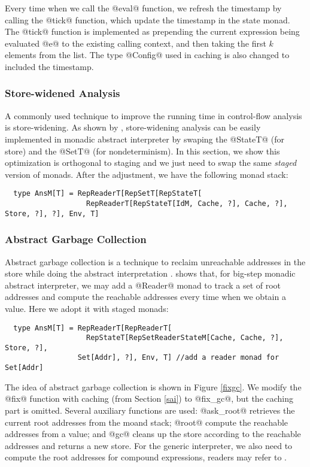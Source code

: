 Every time when we call the @eval@ function, we refresh the timestamp by calling
the @tick@ function, which update the timestamp in the state monad. The @tick@
function is implemented as prepending the current expression being evaluated @e@
to the existing calling context, and then taking the first $k$ elements from the list.
The type @Config@ used in caching is also changed to included the timestamp.

\subsubsection{Store-widened Analysis}

A commonly used technique to improve the running time in control-flow analysis
is store-widening. As shown by \cite{Darais:2015:GTM:2814270.2814308,
DBLP:journals/pacmpl/DaraisLNH17}, store-widening analysis can be easily
implemented in monadic abstract interpreter by swaping the @StateT@ (for store)
and the @SetT@ (for nondeterminism). In this section, we show this optimization
is orthogonal to staging and we just need to swap the same \textit{staged}
version of monads. After the adjustment, we have the following monad stack:
\begin{lstlisting}
  type AnsM[T] = RepReaderT[RepSetT[RepStateT[
                   RepReaderT[RepStateT[IdM, Cache, ?], Cache, ?], Store, ?], ?], Env, T]
\end{lstlisting}

\subsubsection{Abstract Garbage Collection}

Abstract garbage collection is a technique to reclaim unreachable addresses in
the store while doing the abstract interpretation
\cite{Might:2006:IFA:1159803.1159807}. \citet{DBLP:journals/pacmpl/DaraisLNH17}
shows that, for big-step monadic abstract interpreter, we may add a @Reader@
monad to track a set of root addresses and compute the reachable addresses every
time when we obtain a value. Here we adopt it with staged monads:
\begin{lstlisting}
  type AnsM[T] = RepReaderT[RepReaderT[
                   RepStateT[RepSetReaderStateM[Cache, Cache, ?], Store, ?],
                 Set[Addr], ?], Env, T] //add a reader monad for Set[Addr]
\end{lstlisting}

The idea of abstract garbage collection is shown in Figure \ref{fixgc}. We modify the @fix@
function with caching (from Section \ref{sai}) to @fix_gc@, but the caching part
is omitted. Several auxiliary functions are used: @ask_root@ retrieves the
current root addresses from the moand stack; @root@ compute the reachable
addresses from a value; and @gc@ cleans up the store according to the reachable
addresses and returns a new store. For the generic interpreter, we also need to
compute the root addresses for compound expressions, readers may refer to
\cite{DBLP:journals/pacmpl/DaraisLNH17}.

